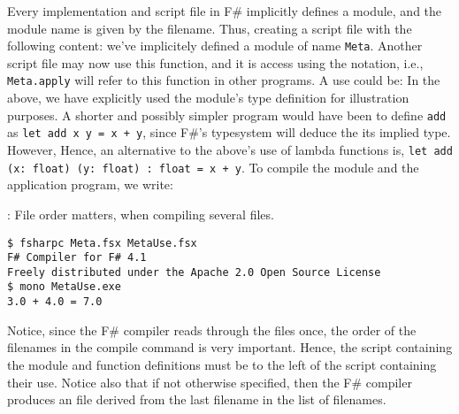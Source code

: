 Every implementation and script file in F\# implicitly defines a module, and the module name is given by the filename. Thus, creating a script file  with the following content:
%
%
we've implicitely defined a module of name \lstinline{Meta}. Another script file may now use this function, and it is access using the  notation, i.e., \lstinline{Meta.apply} will refer to this function in other programs. A use could be:
%
%
In the above, we have explicitly used the module's type definition for illustration purposes. A shorter and possibly simpler program would have been to define \lstinline{add} as \lstinline{let add x y = x + y}, since F\#'s typesystem will deduce the its implied type. However,  Hence, an alternative to the above's use of lambda functions is, \lstinline{let add (x: float) (y: float) : float = x + y}. To compile the module and the application program, we write:
\begin{codeNOutput}{: File order matters, when compiling several files.}
\begin{lstlisting}[language=console,escapechar=§]
$ fsharpc Meta.fsx MetaUse.fsx
F# Compiler for F# 4.1
Freely distributed under the Apache 2.0 Open Source License
$ mono MetaUse.exe 
3.0 + 4.0 = 7.0
\end{lstlisting}
\end{codeNOutput}
Notice, since the F\# compiler reads through the files once, the order of the filenames in the compile command is very important. Hence, the script containing the module and function definitions must be to the left of the script containing their use. Notice also that if not otherwise specified, then the F\# compiler produces an  file derived from the last filename in the list of filenames.

